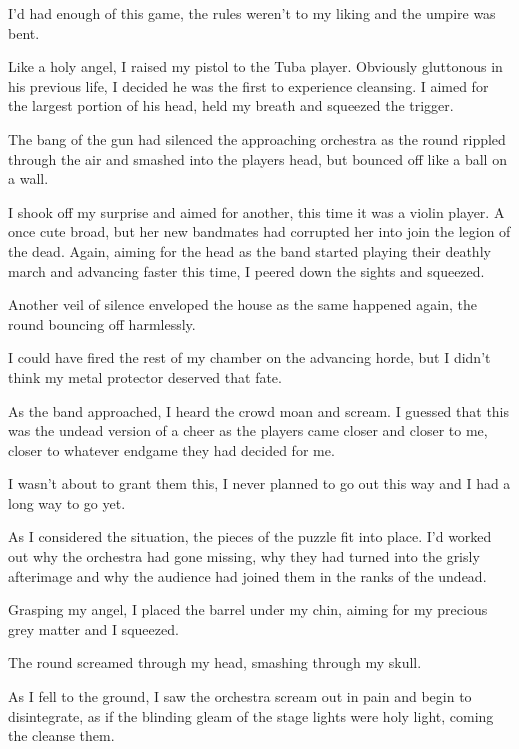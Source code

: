 I'd had enough of this game, the rules weren't to my
liking and the umpire was bent.

Like a holy angel, I raised my pistol to the Tuba player. Obviously
gluttonous in his previous life, I decided he was the first to
experience cleansing. I aimed for the largest portion of his head,
held my breath and squeezed the trigger.

The bang of the gun had silenced the approaching orchestra as the
round rippled through the air and smashed into the players head,
but bounced off like a ball on a wall.



I shook off my surprise and aimed for another, this time it was a
violin player. A once cute broad, but her new bandmates had
corrupted her into join the legion of the dead. Again, aiming for
the head as the band started playing their deathly march and
advancing faster this time, I peered down the sights and
squeezed.

Another veil of silence enveloped the house as the same happened
again, the round bouncing off harmlessly.



I could have fired the rest of my chamber on the advancing horde,
but I didn't think my metal protector deserved that
fate.

As the band approached, I heard the crowd moan and scream. I
guessed that this was the undead version of a cheer as the players
came closer and closer to me, closer to whatever endgame they had
decided for me.

I wasn't about to grant them this, I never planned to go out
this way and I had a long way to go yet.

As I considered the situation, the pieces of the puzzle fit into
place. I'd worked out why the orchestra had gone missing, why
they had turned into the grisly afterimage and why the audience had
joined them in the ranks of the undead.



Grasping my angel, I placed the barrel under my chin, aiming for my
precious grey matter and I squeezed.



The round screamed through my head, smashing through my
skull.



As I fell to the ground, I saw the orchestra scream out in pain and
begin to disintegrate, as if the blinding gleam of the stage lights
were holy light, coming the cleanse them.

